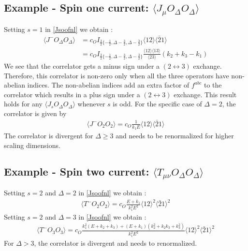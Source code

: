 \documentclass[a4paper,11pt]{article}
\begin{document}
\subsection*{Example - Spin one current: $\langle J_{\mu}O_{\Delta}O_{\Delta} \rangle$ }
Setting $s=1$ in \eqref{Jsoofnl} we obtain :
\begin{equation}\begin{split}
  \langle J^- O_{\Delta}O_{\Delta} \rangle &=  c_O I_{\frac{3}{2}\{-\frac{1}{2},\Delta-\frac{3}{2},\Delta-\frac{3}{2}\}}\langle 12 \rangle \langle\bar{2}1\rangle\\
  &=  c_O I_{\frac{3}{2}\{-\frac{1}{2},\Delta-\frac{3}{2},\Delta-\frac{3}{2}\}} \frac{\langle 12 \rangle \langle 13 \rangle}{\langle 23 \rangle}(k_2+k_3-k_1)
\end{split}\end{equation}
We see that the correlator gets a minus sign under a $(2 \leftrightarrow 3)$ exchange. Therefore, this correlator is non-zero only when all the three operators have non-abelian indices. The non-abelian indices add an extra factor of $f^{abc}$ to the correlator which results in a plus sign under a $(2 \leftrightarrow 3)$ exchange. This result holds for any $\langle J_s O_{\Delta} O_{\Delta} \rangle$ whenever $s$ is odd. 
For the specific case of $\Delta=2$, the correlator is given by
\begin{align}
\langle J^- O_2 O_2 \rangle = c_O \frac{1}{k_1 E}\langle 12 \rangle \langle \bar{2}1 \rangle
\end{align}
The correlator is divergent for $\Delta \ge 3$ and needs to be renormalized for higher scaling dimensions.

\subsection*{Example - Spin two current: $\langle T_{\mu\nu}O_{\Delta}O_{\Delta} \rangle$ } 
Setting $s=2$ and $\Delta=2$ in \eqref{Jsoofnl} we obtain :
\begin{align}
\langle T^- O_2 O_2 \rangle = c_O \frac{E+k_1}{k_1^2 E^2}\langle 12 \rangle^2 \langle \bar{2}1 \rangle^2
\end{align}
Setting $s=2$ and $\Delta=3$ in \eqref{Jsoofnl} we obtain :
\begin{align}
\langle T^- O_3 O_3 \rangle = c_O \frac{k_1^2(E+k_2+k_3)+(E+k_1)(k_2^2+k_2k_3+k_3^2)}{k_1^2 E^2}\langle 12 \rangle^2 \langle \bar{2}1 \rangle^2
\end{align}
For $\Delta >3$, the correlator is divergent and needs to renormalized. 
\end{document}
